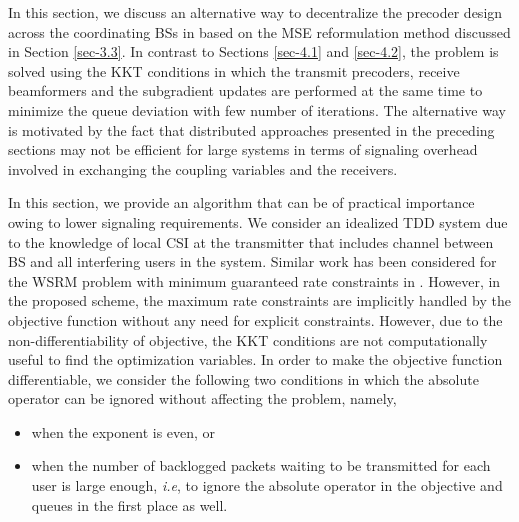 In this section, we discuss an alternative way to decentralize the precoder design across the coordinating \acp{BS} in  based on the \ac{MSE} reformulation method discussed in Section \ref{sec-3.3}. In contrast to Sections \ref{sec-4.1} and \ref{sec-4.2}, the problem is solved using the \ac{KKT} conditions in which the transmit precoders, receive beamformers and the subgradient updates are performed at the same time to minimize the queue deviation with few number of iterations. The alternative way is motivated by the fact that distributed approaches presented in the preceding sections may not be efficient for large systems in terms of signaling overhead involved in exchanging the coupling variables and the receivers.

In this section, we provide an algorithm that can be of practical importance owing to lower signaling requirements. We consider an idealized \ac{TDD} system due to the knowledge of local \ac{CSI} at the transmitter that includes channel between \ac{BS}  and all interfering users in the system. Similar work has been considered for the \ac{WSRM} problem with minimum guaranteed rate constraints in \cite{kaleva2013decentralized}. However, in the proposed scheme, the maximum rate constraints are implicitly handled by the objective function without any need for explicit constraints. However, due to the non-differentiability of objective, the \ac{KKT} conditions are not computationally useful to find the optimization variables. In order to make the objective function differentiable, we consider the following two conditions in which the absolute operator can be ignored without affecting the problem, namely,
\begin{itemize}
\item when the exponent  is even, or
\item when the number of backlogged packets waiting to be transmitted for each user is large enough, \textit{i.e},  to ignore the absolute operator in the objective and queues in the first place as well.
\end{itemize}

